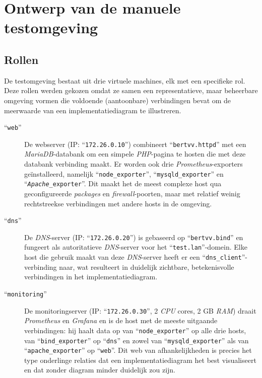 \section{Ontwerp van de manuele testomgeving}%
\label{sec:ontwerp_manuele_testomgeving}

\subsection{Rollen}%

De testomgeving bestaat uit drie virtuele machines, elk met een specifieke rol. Deze rollen werden gekozen omdat ze samen een representatieve, maar beheerbare omgeving vormen die voldoende (aantoonbare) verbindingen bevat om de meerwaarde van een implementatiediagram te illustreren.

\begin{description}
    \item[``\texttt{web}''] De webserver (IP: ``\texttt{172.26.0.10}'') combineert ``\texttt{bertvv.httpd}'' met een \emph{MariaDB}-databank om een simpele \emph{PHP}-pagina te hosten die met deze databank verbinding maakt. Er worden ook drie \emph{Prometheus}-exporters geïnstalleerd, namelijk ``\texttt{node\_exporter}'', ``\texttt{mysqld\_exporter}'' en ``\texttt{\emph{Apache}\_exporter}''. Dit maakt het de meest complexe host qua geconfigureerde \emph{packages} en \emph{firewall}-poorten, maar met relatief weinig rechtstreekse verbindingen met andere hosts in de omgeving.
    \item[``\texttt{dns}''] De \emph{DNS}-server (IP: ``\texttt{172.26.0.20}'') is gebaseerd op ``\texttt{bertvv.bind}'' en fungeert als autoritatieve \emph{DNS}-server voor het ``\texttt{test.lan}''-domein. Elke host die gebruik maakt van deze \emph{DNS}-server heeft er een ``\texttt{dns\_client}''-verbinding naar, wat resulteert in duidelijk zichtbare, betekenisvolle verbindingen in het implementatiediagram.
    \item[``\texttt{monitoring}''] De monitoringserver (IP: ``\texttt{172.26.0.30}'', 2 \emph{CPU} cores, 2 GB \emph{RAM}) draait \emph{Prometheus} en \emph{Grafana} en is de host met de meeste uitgaande verbindingen: hij haalt data op van ``\texttt{node\_exporter}'' op alle drie hosts, van ``\texttt{bind\_exporter}'' op ``\texttt{dns}'' en zowel van ``\texttt{mysqld\_exporter}'' als van ``\texttt{apache\_exporter}'' op ``\texttt{web}''. Dit web van afhankelijkheden is precies het type onderlinge relaties dat een implementatiediagram het best visualiseert en dat zonder diagram minder duidelijk zou zijn.
\end{description}

